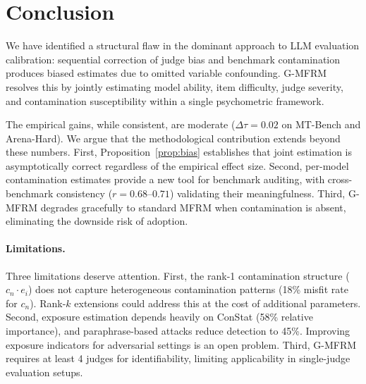 \documentclass[11pt]{article}
\begin{document}
\section{Conclusion}

We have identified a structural flaw in the dominant approach to LLM evaluation calibration: sequential correction of judge bias and benchmark contamination produces biased estimates due to omitted variable confounding. G-MFRM resolves this by jointly estimating model ability, item difficulty, judge severity, and contamination susceptibility within a single psychometric framework.

The empirical gains, while consistent, are moderate ($\Delta\tau = 0.02$ on MT-Bench and Arena-Hard). We argue that the methodological contribution extends beyond these numbers. First, Proposition~\ref{prop:bias} establishes that joint estimation is asymptotically correct regardless of the empirical effect size. Second, per-model contamination estimates provide a new tool for benchmark auditing, with cross-benchmark consistency ($r = 0.68$--$0.71$) validating their meaningfulness. Third, G-MFRM degrades gracefully to standard MFRM when contamination is absent, eliminating the downside risk of adoption.

\paragraph{Limitations.}
Three limitations deserve attention. First, the rank-1 contamination structure ($c_n \cdot e_i$) does not capture heterogeneous contamination patterns (18\% misfit rate for $c_n$). Rank-$k$ extensions could address this at the cost of additional parameters. Second, exposure estimation depends heavily on ConStat (58\% relative importance), and paraphrase-based attacks reduce detection to 45\%. Improving exposure indicators for adversarial settings is an open problem. Third, G-MFRM requires at least 4 judges for identifiability, limiting applicability in single-judge evaluation setups.



\end{document}
